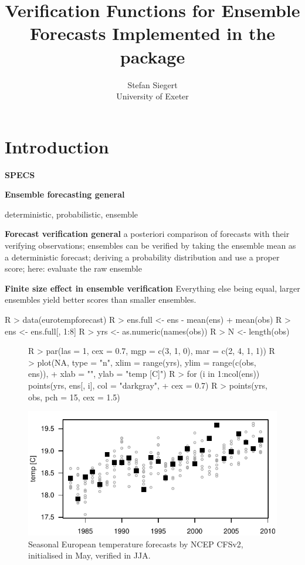 \documentclass[article]{jss}
\author{Stefan Siegert\\University of Exeter}
\title{Verification Functions for Ensemble Forecasts Implemented in the \proglang{R} package \pkg{SpecsVerification}}
\begin{document}



\section{Introduction}

{\bf SPECS}

{\bf Ensemble forecasting general}

deterministic, probabilistic, ensemble


{\bf Forecast verification general}
a posteriori comparison of forecasts with their verifying observations;
ensembles can be verified by taking the ensemble mean as a deterministic forecast; deriving a probability distribution and use a proper score; here: evaluate the raw ensemble

{\bf Finite size effect in ensemble verification}
Everything else being equal, larger ensembles yield better scores than smaller ensembles.


\begin{Schunk}
\begin{Sinput}
R > data(eurotempforecast)
R > ens.full <- ens - mean(ens) + mean(obs)
R > ens <- ens.full[, 1:8]
R > yrs <- as.numeric(names(obs))
R > N   <- length(obs)
\end{Sinput}
\end{Schunk}


\begin{figure}
\begin{center}
%
\begin{Schunk}
\begin{Sinput}
R > par(las = 1, cex = 0.7, mgp = c(3, 1, 0), mar = c(2, 4, 1, 1))
R > plot(NA, type = "n", xlim = range(yrs), ylim = range(c(obs, ens)), 
+     xlab = "", ylab = "temp [C]")
R > for (i in 1:ncol(ens)) points(yrs, ens[, i], col = "darkgray", 
+     cex = 0.7)
R > points(yrs, obs, pch = 15, cex = 1.5)
\end{Sinput}
\end{Schunk}
\includegraphics{fig-gfs-plot}
%
\end{center}
\caption{Seasonal European temperature forecasts by NCEP CFSv2, initialised in May, verified in JJA.}
\label{gfs-plot}
\end{figure}
\end{document}
